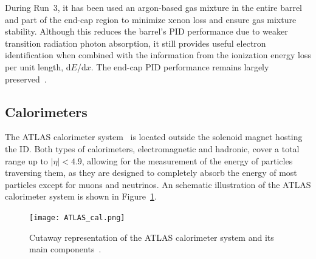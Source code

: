 During Run~3, it has been used an argon-based gas mixture in the entire barrel and part of the end-cap region to minimize xenon loss and ensure gas mixture stability. Although this reduces the barrel's PID performance due to weaker transition radiation photon absorption, it still provides useful electron identification when combined with the information from the ionization energy loss per unit length, d$E$/d$x$. The end-cap PID performance remains largely preserved~\cite{ATLAS_run3}.

\subsection{Calorimeters}
\label{sec:calo}
The ATLAS calorimeter system~\cite{2010_lar,2010_tile} is located outside the solenoid magnet hosting the ID. Both types of calorimeters, electromagnetic and hadronic, cover a total range up to $|\eta| < 4.9$, allowing for the measurement of the energy of particles traversing them, 
as they are designed to completely absorb the energy of most particles except for muons and neutrinos. An schematic illustration of the ATLAS calorimeter system is shown in Figure~\ref{fig:cal}.
\begin{figure}[htbp]
    \centering
        \texttt{[image: ATLAS\_cal.png]}
    \caption{Cutaway representation of the ATLAS calorimeter system and its main components~\cite{ATLAS_run3}.}
    \label{fig:cal}
\end{figure}

